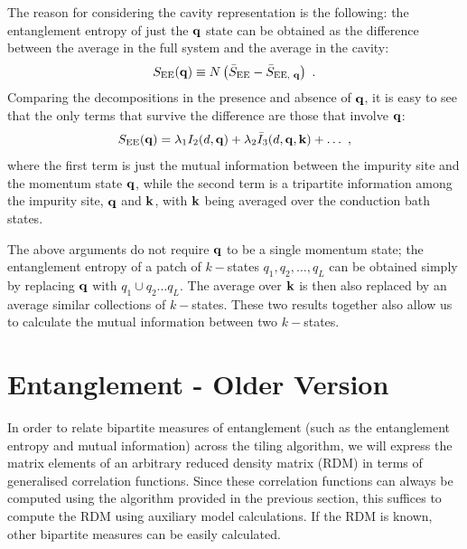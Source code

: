 \documentclass[reprint,hidelinks,onecolumn]{revtex4-2}
\begin{document}
The reason for considering the cavity representation is the following: the entanglement entropy of just the \({\bf q}\) state can be obtained as the difference between the average in the full system and the average in the cavity:
\begin{equation}\begin{aligned}
	S_\text{EE}({\bf q}) \equiv N\left(\bar S_\text{EE} - \bar S_\text{EE, {\bf q}}\right) ~.
\end{aligned}\end{equation}
Comparing the decompositions in the presence and absence of \({\bf q}\), it is easy to see that the only terms that survive the difference are those that involve \({\bf q}\):
\begin{equation}\begin{aligned}
	S_\text{EE}({\bf q}) = \lambda_1 I_2(d,{\bf q}) + \lambda_2 \bar I_3(d,{\bf q},{\bf k}) + \ldots~,
\end{aligned}\end{equation}
where the first term is just the mutual information between the impurity site and the momentum state \({\bf q}\), while the second term is a tripartite information among the impurity site, \({\bf q}\) and \({\bf k}\), with \({\bf k}\) being averaged over the conduction bath states.

The above arguments do not require \({\bf q}\) to be a single momentum state; the entanglement entropy of a patch of \(k-\)states \(q_1, q_2, \ldots, q_L\) can be obtained simply by replacing \({\bf q}\) with \(q_1\cup q_2\ldots q_L\). The average over \({\bf k}\) is then also replaced by an average similar collections of \(k-\)states. These two results together also allow us to calculate the mutual information between two \(k-\)states.


 

\section{Entanglement - Older Version}
In order to relate bipartite measures of entanglement (such as the entanglement entropy and mutual information) across the tiling algorithm, we will express the matrix elements of an arbitrary reduced density matrix (RDM) in terms of generalised correlation functions. Since these correlation functions can always be computed using the algorithm provided in the previous section, this suffices to compute the RDM using auxiliary model calculations. If the RDM is known, other bipartite measures can be easily calculated.
\end{document}
